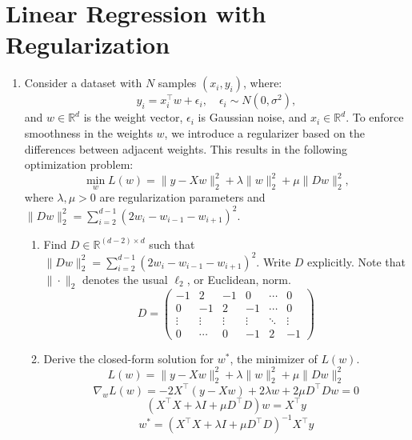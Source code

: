 \documentclass[a3paper,12pt]{extarticle} %
\begin{document}
\section{Linear Regression with Regularization}
\begin{enumerate}
    \item Consider a dataset with \( N \) samples \((x_i, y_i)\), where:
    \[
    y_i = x_i^\top w + \epsilon_i, \quad \epsilon_i \sim N(0, \sigma^2),
    \]
    and \( w \in \mathbb{R}^d \) is the weight vector, \(\epsilon_i\) is Gaussian noise, and \( x_i \in \mathbb{R}^d \).
    To enforce smoothness in the weights \( w \), we introduce a regularizer based on the differences between adjacent weights. This results in the following optimization problem:
    \[
    \min_w L(w) = \|y - Xw\|_2^2 + \lambda \|w\|_2^2 + \mu \|Dw\|_2^2,
    \]
    where \(\lambda, \mu > 0\) are regularization parameters and \(\|Dw\|_2^2 = \sum_{i=2}^{d-1} (2w_i - w_{i-1} - w_{i+1})^2\).

    \begin{enumerate}
        \item Find \( D \in \mathbb{R}^{(d-2) \times d} \) such that \(\|Dw\|_2^2 = \sum_{i=2}^{d-1} (2w_i - w_{i-1} - w_{i+1})^2\). Write \( D \) explicitly. Note that \(\|\cdot\|_2\) denotes the usual \(\ell_2\), or Euclidean, norm.
        \[
        D = \begin{pmatrix}
        -1 & 2 & -1 & 0 & \cdots & 0 \\
        0 & -1 & 2 & -1 & \cdots & 0 \\
        \vdots & \vdots & \vdots & \vdots & \ddots & \vdots \\
        0 & \cdots & 0 & -1 & 2 & -1
        \end{pmatrix}
        \]

        \item Derive the closed-form solution for \( w^* \), the minimizer of \( L(w) \).
        \[
        L(w) = \|y - Xw\|_2^2 + \lambda \|w\|_2^2 + \mu \|Dw\|_2^2
        \]
        \[
        \nabla_w L(w) = -2X^\top (y - Xw) + 2\lambda w + 2\mu D^\top Dw = 0
        \]
        \[
        (X^\top X + \lambda I + \mu D^\top D)w = X^\top y
        \]
        \[
        w^* = (X^\top X + \lambda I + \mu D^\top D)^{-1} X^\top y
        \]


\end{enumerate}
\end{enumerate}
\end{document}
